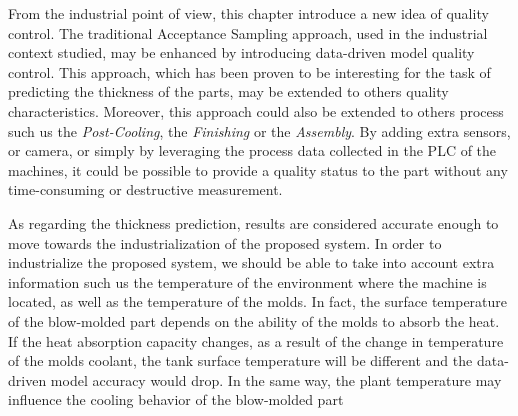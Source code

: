 From the industrial point of view, this chapter introduce a new idea of quality control. The traditional Acceptance Sampling approach, used in the industrial context studied, may be enhanced by introducing data-driven model quality control. This approach, which has been proven to be interesting for the task of predicting the thickness of the parts, may be extended to others quality characteristics. Moreover, this approach could also be extended to others process such us the \textit{Post-Cooling}, the \textit{Finishing} or the \textit{Assembly}. By adding extra sensors, or camera, or simply by leveraging the process data collected in the PLC of the machines, it could be possible to provide a quality status to the part without any time-consuming or destructive measurement. 

As regarding the thickness prediction, results are considered accurate enough to move towards the industrialization of the proposed system. In order to industrialize the proposed system, we should be able to take into account extra information such us the temperature of the environment where the machine is located, as well as the temperature of the molds. In fact, the surface temperature of the blow-molded part depends on the ability of the molds to absorb the heat. If the heat absorption capacity changes, as a result of the change in temperature of the molds coolant, the tank surface temperature will be different and the data-driven model accuracy would drop. In the same way, the plant temperature may influence the cooling behavior of the blow-molded part   




